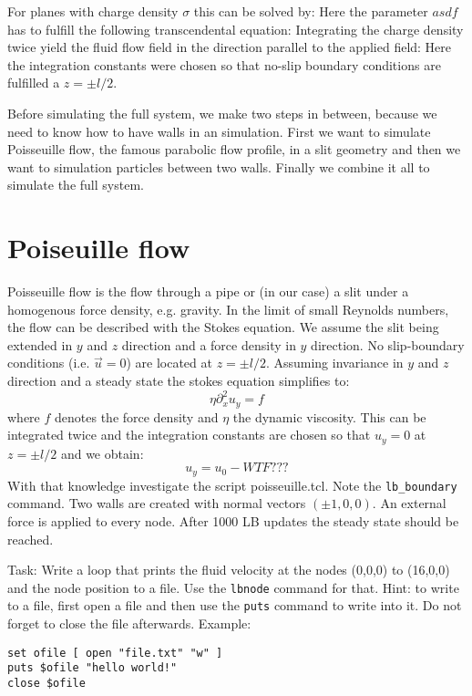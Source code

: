 For planes with charge density $\sigma$ this can be solved by:
Here the parameter $asdf$ has to fulfill the following transcendental
equation:
Integrating the charge density twice yield the fluid flow field
in the direction parallel to the applied field:
Here the integration constants were chosen so that no-slip boundary
conditions are fulfilled a $z = \pm l/2$.

Before simulating the full system, we make two steps in between, because
we need to know how to have walls in an \ES{} simulation. First we want
to simulate Poisseuille flow, the famous parabolic flow profile, in a slit
geometry and then we want to simulation particles between two walls. Finally
we combine it all to simulate the full system.
\section{Poiseuille flow \ES{}}
Poisseuille flow is the flow through a pipe or (in our case) a slit
under a homogenous force density, e.g. gravity. In the limit of small Reynolds
numbers, the flow can be described with the Stokes equation. 
We assume the slit being extended in $y$ and $z$ direction and a force
density in $y$ direction. No slip-boundary conditions  (i.e. $\vec{u}=0$)
are located at $z = \pm l/2$.
Assuming invariance in $y$ and $z$ direction and a steady state 
the stokes equation simplifies to:
\begin{equation}
  \eta \partial_x^2 u_y = f
\end{equation}
where $f$ denotes the force density and $\eta$ the dynamic viscosity.
This can be integrated twice and the integration constants are chosen
so that $u_y=0$ at $z = \pm l/2$ and we obtain:
\begin{equation}
  u_y = u_0 - WTF???
\end{equation}
With that knowledge investigate the script poisseuille.tcl.
Note the \lstinline{lb_boundary} command. Two walls are created
with normal vectors $\left(\pm 1, 0, 0 \right)$. An external force
is applied to every node. After 1000 LB updates the steady state should
be reached.

Task: Write a loop that prints the fluid velocity at the nodes (0,0,0) to (16,0,0)
and the node position to a file. Use the \lstinline|lbnode| command for that. Hint: to write 
to a file, first open a file and then use the \lstinline|puts| command to write 
into it. Do not forget to close the file afterwards. Example:
\vspace{ 0,2cm}
\begin{lstlisting}[numbers=none]
set ofile [ open "file.txt" "w" ]
puts $ofile "hello world!"
close $ofile
\end{lstlisting}
\vspace{ 0,2cm}

